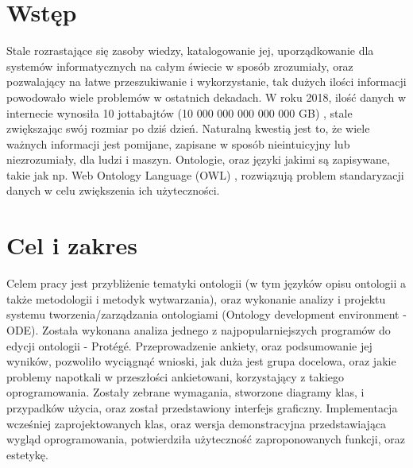 \documentclass[a4paper,12pt, twoside]{book} %
\begin{document}
\sloppy



\thispagestyle{empty}



\newpage{}

\thispagestyle{empty}

\newpage{}



\tableofcontents{}

\chapter*{Wstęp} %
Stale rozrastające się zasoby wiedzy, katalogowanie jej, uporządkowanie dla systemów informatycznych na całym świecie w sposób zrozumiały, oraz pozwalający na łatwe przeszukiwanie i wykorzystanie, tak dużych ilości informacji powodowało wiele problemów w ostatnich dekadach. W roku 2018, ilość danych w internecie wynosiła 10 jottabajtów (10 000 000 000 000 000 GB) \cite{EwelinaStoj.}, stale zwiększając swój rozmiar po dziś dzień. Naturalną kwestią jest to, że wiele ważnych informacji jest pomijane, zapisane w sposób nieintuicyjny lub niezrozumiały, dla ludzi i maszyn. Ontologie, oraz języki jakimi są zapisywane, takie jak np. Web Ontology Language (OWL) \cite{wow}, rozwiązują problem standaryzacji danych w celu zwiększenia ich użyteczności.

\chapter*{Cel i zakres}
Celem pracy jest przybliżenie tematyki ontologii (w tym języków opisu ontologii a także metodologii
i metodyk wytwarzania), oraz wykonanie analizy i projektu systemu tworzenia/zarządzania ontologiami (Ontology development environment - ODE).
Została wykonana analiza jednego z najpopularniejszych programów do edycji ontologii - Protégé. Przeprowadzenie ankiety, oraz podsumowanie jej wyników, pozwoliło wyciągnąć wnioski, jak duża jest grupa docelowa, oraz jakie problemy napotkali w przeszłości ankietowani, korzystający z takiego oprogramowania. Zostały zebrane wymagania, stworzone diagramy klas, i przypadków użycia, oraz został przedstawiony interfejs graficzny. Implementacja wcześniej zaprojektowanych klas, oraz wersja demonstracyjna przedstawiająca wygląd oprogramowania, potwierdziła użyteczność zaproponowanych funkcji, oraz estetykę.
\end{document}
